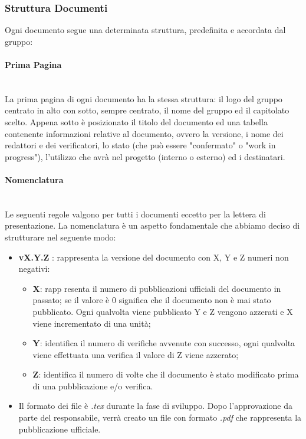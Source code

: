 \subsubsection{Struttura Documenti}\label{ProcessiSupporto_Documentazione_StrutturaDocumenti}
Ogni documento segue una determinata struttura, predefinita e accordata dal gruppo:

\paragraph{Prima Pagina} \-\\
La prima pagina di ogni documento ha la stessa struttura: il logo del gruppo centrato in alto con sotto, sempre centrato, il nome del gruppo ed il capitolato scelto. Appena sotto è posizionato il titolo del documento ed una tabella contenente informazioni relative al documento, ovvero la versione, i nome dei redattori e dei verificatori, lo stato (che può essere "confermato" o "work in progress"), l'utilizzo che avrà nel progetto (interno o esterno) ed i destinatari.

\paragraph{Nomenclatura} \-\\
Le seguenti regole valgono per tutti i documenti eccetto per la lettera di presentazione. La nomenclatura è un aspetto fondamentale che abbiamo deciso di strutturare nel seguente modo:
\begin{itemize}
	\item \textbf{vX.Y.Z }: rappresenta la versione del documento con X, Y e Z numeri non negativi:
	\begin{itemize}
		\item \textbf{X}: rapp resenta il numero di pubblicazioni ufficiali del documento in passato; se il valore è 0 significa che il documento non è mai stato pubblicato. Ogni qualvolta viene pubblicato Y e Z vengono azzerati e X viene incrementato di una unità;
		\item \textbf{Y}: identifica il numero di verifiche avvenute con successo, ogni qualvolta viene effettuata una verifica il valore di Z viene azzerato;
		\item \textbf{Z}: identifica il numero di volte che il documento è stato modificato prima di una pubblicazione e/o verifica.
	\end{itemize}
	\item Il formato dei file è \textit{.tex} durante la fase di sviluppo. Dopo l'approvazione da parte del responsabile, verrà creato un file con formato \textit{.pdf} che rappresenta la pubblicazione ufficiale.
\end{itemize}

